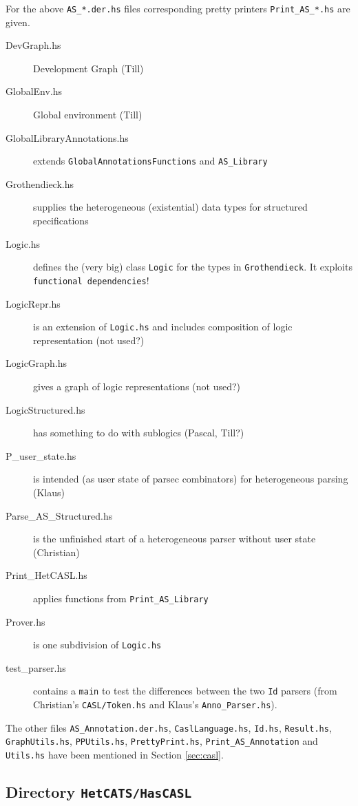 \documentclass{article}
\begin{document}
For the above \texttt{AS\_*.der.hs} files corresponding pretty
printers \texttt{Print\_AS\_*.hs} are given. 

\begin{description}
\item[DevGraph.hs] Development Graph (Till)
\item[GlobalEnv.hs] Global environment (Till)
\item[GlobalLibraryAnnotations.hs] extends \texttt{GlobalAnnotationsFunctions} and \texttt{AS\_Library}
\item[Grothendieck.hs] supplies the heterogeneous (existential) data
  types for structured specifications
\item[Logic.hs] defines the (very big) class \texttt{Logic} for the
  types in \texttt{Grothendieck}. It exploits \texttt{functional
    dependencies}!
\item[LogicRepr.hs] is an extension of \texttt{Logic.hs} and includes
  composition of logic representation (not used?)
\item[LogicGraph.hs] gives a graph of logic representations (not used?)
\item[LogicStructured.hs] has something to do with sublogics (Pascal, Till?)
\item[P\_user\_state.hs] is intended (as user state of parsec
  combinators) for heterogeneous parsing (Klaus)
\item[Parse\_AS\_Structured.hs] is the unfinished start of a heterogeneous
  parser without user state (Christian)
\item[Print\_HetCASL.hs] applies functions from \texttt{Print\_AS\_Library}
\item[Prover.hs] is one subdivision of \texttt{Logic.hs}
\item[test\_parser.hs] contains a \texttt{main} to test the differences
  between the two \texttt{Id} parsers (from Christian's
  \texttt{CASL/Token.hs} and Klaus's \texttt{Anno\_Parser.hs}).
\end{description}

The other files \texttt{AS\_Annotation.der.hs},
\texttt{CaslLanguage.hs}, \texttt{Id.hs}, \texttt{Result.hs},
\texttt{GraphUtils.hs}, \texttt{PPUtils.hs}, \texttt{PrettyPrint.hs},
\texttt{Print\_AS\_Annotation} and \texttt{Utils.hs} have been mentioned in 
Section \ref{sec:casl}.


\subsection{Directory \texttt{HetCATS/HasCASL}}
\end{document}

